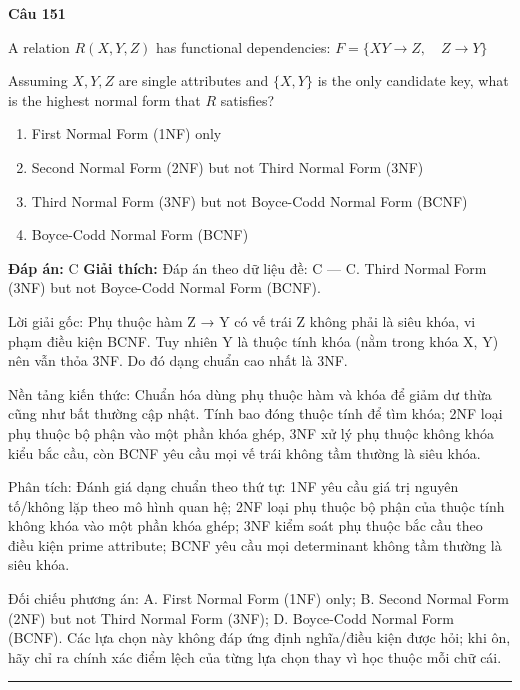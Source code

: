 \documentclass[11pt,a4paper]{article}
\newenvironment{question}[1]{%
  \par\vspace{1em}\noindent\textbf{\large Câu #1}\par\vspace{0.4em}
}{%
  \par\vspace{1em}\hrule\vspace{0.6em}
}
\newenvironment{choices}{%
  \begin{enumerate}[label=\textbf{\Alph*.},leftmargin=2.2em,itemsep=2pt,topsep=3pt]
}{%
  \end{enumerate}
}
\newcommand{\choice}{\item}
\begin{document}
\begin{question}{151}
A relation \(R(X, Y, Z)\) has functional dependencies:
\(F = \{ XY \rightarrow Z, \quad Z \rightarrow Y \}\)

Assuming \(X, Y, Z\) are single attributes and \(\{X, Y\}\) is the only candidate key, what is the highest normal form that \(R\) satisfies?
\begin{choices}
\choice First Normal Form (1NF) only
\choice Second Normal Form (2NF) but not Third Normal Form (3NF)
\choice Third Normal Form (3NF) but not Boyce-Codd Normal Form (BCNF)
\choice Boyce-Codd Normal Form (BCNF)
\end{choices}
\textbf{Đáp án:} C
\textbf{Giải thích:} Đáp án theo dữ liệu đề: C — C. Third Normal Form (3NF) but not Boyce-Codd Normal Form (BCNF).

Lời giải gốc: Phụ thuộc hàm Z → Y có vế trái Z không phải là siêu khóa, vi phạm điều kiện BCNF. Tuy nhiên Y là thuộc tính khóa (nằm trong khóa {X, Y}) nên vẫn thỏa 3NF. Do đó dạng chuẩn cao nhất là 3NF.

Nền tảng kiến thức: Chuẩn hóa dùng phụ thuộc hàm và khóa để giảm dư thừa cũng như bất thường cập nhật. Tính bao đóng thuộc tính để tìm khóa; 2NF loại phụ thuộc bộ phận vào một phần khóa ghép, 3NF xử lý phụ thuộc không khóa kiểu bắc cầu, còn BCNF yêu cầu mọi vế trái không tầm thường là siêu khóa.

Phân tích: Đánh giá dạng chuẩn theo thứ tự: 1NF yêu cầu giá trị nguyên tố/không lặp theo mô hình quan hệ; 2NF loại phụ thuộc bộ phận của thuộc tính không khóa vào một phần khóa ghép; 3NF kiểm soát phụ thuộc bắc cầu theo điều kiện prime attribute; BCNF yêu cầu mọi determinant không tầm thường là siêu khóa.

Đối chiếu phương án: A. First Normal Form (1NF) only; B. Second Normal Form (2NF) but not Third Normal Form (3NF); D. Boyce-Codd Normal Form (BCNF). Các lựa chọn này không đáp ứng định nghĩa/điều kiện được hỏi; khi ôn, hãy chỉ ra chính xác điểm lệch của từng lựa chọn thay vì học thuộc mỗi chữ cái.
\end{question}
\end{document}
